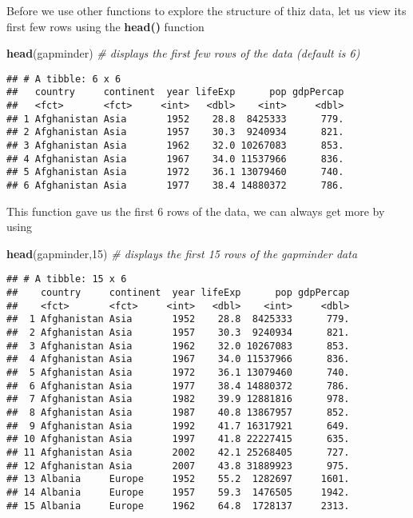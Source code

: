 \documentclass[]{article}
\newenvironment{Shaded}{\begin{snugshade}}{\end{snugshade}}
\newcommand{\KeywordTok}[1]{\textcolor[rgb]{0.13,0.29,0.53}{\textbf{{#1}}}}
\newcommand{\DecValTok}[1]{\textcolor[rgb]{0.00,0.00,0.81}{{#1}}}
\newcommand{\CommentTok}[1]{\textcolor[rgb]{0.56,0.35,0.01}{\textit{{#1}}}}
\newcommand{\NormalTok}[1]{{#1}}
\begin{document}
Before we use other functions to explore the structure of thiz data, let
us view its first few rows using the \textbf{head()} function

\begin{Shaded}
\begin{Highlighting}[]
\KeywordTok{head}\NormalTok{(gapminder) }\CommentTok{# displays the first few rows of the data (default is 6)}
\end{Highlighting}
\end{Shaded}

\begin{verbatim}
## # A tibble: 6 x 6
##   country     continent  year lifeExp      pop gdpPercap
##   <fct>       <fct>     <int>   <dbl>    <int>     <dbl>
## 1 Afghanistan Asia       1952    28.8  8425333      779.
## 2 Afghanistan Asia       1957    30.3  9240934      821.
## 3 Afghanistan Asia       1962    32.0 10267083      853.
## 4 Afghanistan Asia       1967    34.0 11537966      836.
## 5 Afghanistan Asia       1972    36.1 13079460      740.
## 6 Afghanistan Asia       1977    38.4 14880372      786.
\end{verbatim}

This function gave us the first 6 rows of the data, we can always get
more by using

\begin{Shaded}
\begin{Highlighting}[]
\KeywordTok{head}\NormalTok{(gapminder,}\DecValTok{15}\NormalTok{) }\CommentTok{# displays the first 15 rows of the gapminder data}
\end{Highlighting}
\end{Shaded}

\begin{verbatim}
## # A tibble: 15 x 6
##    country     continent  year lifeExp      pop gdpPercap
##    <fct>       <fct>     <int>   <dbl>    <int>     <dbl>
##  1 Afghanistan Asia       1952    28.8  8425333      779.
##  2 Afghanistan Asia       1957    30.3  9240934      821.
##  3 Afghanistan Asia       1962    32.0 10267083      853.
##  4 Afghanistan Asia       1967    34.0 11537966      836.
##  5 Afghanistan Asia       1972    36.1 13079460      740.
##  6 Afghanistan Asia       1977    38.4 14880372      786.
##  7 Afghanistan Asia       1982    39.9 12881816      978.
##  8 Afghanistan Asia       1987    40.8 13867957      852.
##  9 Afghanistan Asia       1992    41.7 16317921      649.
## 10 Afghanistan Asia       1997    41.8 22227415      635.
## 11 Afghanistan Asia       2002    42.1 25268405      727.
## 12 Afghanistan Asia       2007    43.8 31889923      975.
## 13 Albania     Europe     1952    55.2  1282697     1601.
## 14 Albania     Europe     1957    59.3  1476505     1942.
## 15 Albania     Europe     1962    64.8  1728137     2313.
\end{verbatim}
\end{document}
